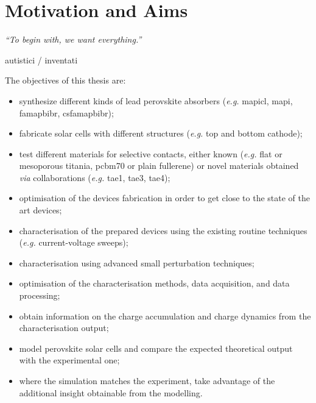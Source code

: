 %
%
%
%

\newpage

\section{Motivation and Aims}\label{sec:aims}
\epigraph{\textit{\enquote{To begin with, we want everything.}}}{autistici / inventati}


The objectives of this thesis are:\nolinebreak
\begin{itemize}
	\item synthesize different kinds of lead perovskite absorbers (\textsl{e.g.} \gls{mapicl}, \gls{mapi}, \gls{famapbibr}, \gls{csfamapbibr});
	\item fabricate solar cells with different structures (\textsl{e.g.} top and bottom cathode);
	\item test different materials for selective contacts, either known (\textsl{e.g.} flat or mesoporous titania, \gls{pcbm70} or plain fullerene) or novel materials obtained \textsl{via} collaborations (\textsl{e.g.} \gls{tae1}, \gls{tae3}, \gls{tae4});
	\item optimisation of the devices fabrication in order to get close to the state of the art devices;
	\item characterisation of the prepared devices using the existing routine techniques (\textsl{e.g.} current\hyp{}voltage sweeps);
	\item characterisation using advanced small perturbation techniques;
	\item optimisation of the characterisation methods, data acquisition, and data processing;
	\item obtain information on the charge accumulation and charge dynamics from the characterisation output;
	\item model perovskite solar cells and compare the expected theoretical output with the experimental one;
	\item where the simulation matches the experiment, take advantage of the additional insight obtainable from the modelling.	
\end{itemize} 

